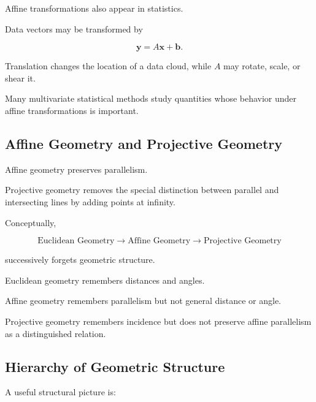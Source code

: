 Affine transformations also appear in statistics.

Data vectors may be transformed by

\[ \mathbf{y}=A\mathbf{x}+\mathbf{b}. \]

Translation changes the location of a data cloud, while \(A\) may rotate,
scale, or shear it.

Many multivariate statistical methods study quantities whose behavior under
affine transformations is important.

\subsection{Affine Geometry and Projective Geometry}
\label{subsec:affine-projective-connection}

Affine geometry preserves parallelism.

Projective geometry removes the special distinction between parallel and
intersecting lines by adding points at infinity.

Conceptually,

\[
\boxed{
\text{Euclidean Geometry}
\longrightarrow
\text{Affine Geometry}
\longrightarrow
\text{Projective Geometry}
}
\]

successively forgets geometric structure.

Euclidean geometry remembers distances and angles.

Affine geometry remembers parallelism but not general distance or angle.

Projective geometry remembers incidence but does not preserve affine
parallelism as a distinguished relation.

\subsection{Hierarchy of Geometric Structure}
\label{subsec:geometric-structure-hierarchy}

A useful structural picture is:

\begin{centereddiagram}
\end{centereddiagram}

